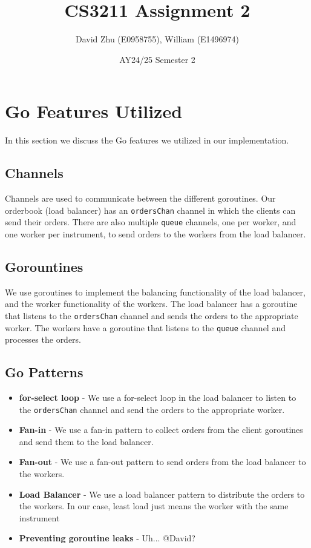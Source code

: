 \documentclass[11pt]{article}
\title{CS3211 Assignment 2}
\author{David Zhu (E0958755), William (E1496974)}
\date{AY24/25 Semester 2}
\begin{document}
\maketitle

\section{Go Features Utilized}

In this section we discuss the Go features we utilized in our implementation.

\subsection{Channels}

Channels are used to communicate between the different goroutines. Our orderbook (load balancer) has
an \texttt{ordersChan} channel in which the clients can send their orders.
There are also multiple \texttt{queue} channels, one per worker, and one worker per instrument, to send orders to the workers from the load balancer.

\subsection{Gorountines}

We use goroutines to implement the balancing functionality of the load balancer, and the worker functionality of the workers.
The load balancer has a goroutine that listens to the \texttt{ordersChan} channel and sends the orders to the appropriate worker.
The workers have a goroutine that listens to the \texttt{queue} channel and processes the orders.

\subsection{Go Patterns}

\begin{itemize}

\item \textbf{for-select loop} - We use a for-select loop in the load balancer to listen to the \texttt{ordersChan} channel and send the orders to the appropriate worker.
\item \textbf{Fan-in} - We use a fan-in pattern to collect orders from the client goroutines and send them to the load balancer.
\item \textbf{Fan-out} - We use a fan-out pattern to send orders from the load balancer to the workers.
\item \textbf{Load Balancer} - We use a load balancer pattern to distribute the orders to the workers. In our case, least load just means the worker with the same instrument
\item \textbf{Preventing goroutine leaks} - Uh... @David?

\end{itemize}
\end{document}
